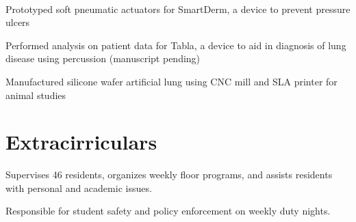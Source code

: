 \documentclass[]{deedy-resume}
\begin{document}
\begin{minipage}[t]{0.66\textwidth}
 \\
\vspace{\topsep} %
\begin{tightemize}
\item Prototyped soft pneumatic actuators for SmartDerm, a device to prevent pressure ulcers
\item Performed analysis on patient data for Tabla, a device to aid in diagnosis of lung disease using percussion (manuscript pending)
\item Manufactured silicone wafer artificial lung using CNC mill and SLA printer for animal studies
\item 
\end{tightemize}
\sectionsep


\section{Extracirriculars}
\descript{}
\begin{tightemize}
\item Supervises 46 residents, organizes weekly floor programs, and assists residents with personal and academic issues.
\item Responsible for student safety and policy enforcement on weekly duty nights.
\end{tightemize}
\sectionsep

\end{minipage} 
\end{document}

